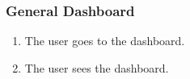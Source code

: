 \subsubsection{General Dashboard}

\begin{enumerate}
    \item The user goes to the dashboard.
    \item The user sees the dashboard.
\end{enumerate}

